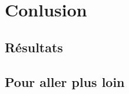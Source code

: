 \documentclass{article}
\begin{document}
\pagebreak
\section{Conlusion}
\subsection{Résultats}

\subsection{Pour aller plus loin}

\pagebreak
\end{document}
